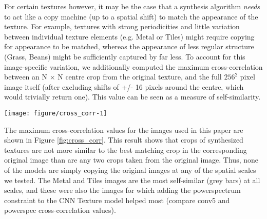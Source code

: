\documentclass[doc, 11pt,a4paper,natbib]{apa6}\usepackage[]{graphicx}\usepackage[]{color}
\makeatletter
\def\maxwidth{ %
  \ifdim\Gin@nat@width>\linewidth
    \linewidth
  \else
    \Gin@nat@width
  \fi
}
\newenvironment{knitrout}{}{} %
\makeatother
\begin{document}
For certain textures however, it may be the case that a synthesis algorithm \textit{needs} to act like a copy machine (up to a spatial shift) to match the appearance of the texture.
For example, textures with strong periodicities and little variation between individual texture elements (e.g. Metal or Tiles) might require copying for appearance to be matched, whereas the appearance of less regular structure (Grass, Beans) might be sufficiently captured by far less.
To account for this image-specific variation, we additionally computed the maximum cross-correlation between an N $\times$ N centre crop from the original texture, and the full $256^2$ pixel image itself (after excluding shifts of +/- 16 pixels around the centre, which would trivially return one).
This value can be seen as a measure of self-similarity.




\begin{knitrout}
\color{fgcolor}\begin{figure*}
\texttt{[image: figure/cross\_corr-1]} \caption[Controlling for texture model overfit]{Controlling for texture model overfit. 
              Points show the average maximum cross-correlations between crops of model syntheses (colours) and the original images, for three different crop sizes (32, 64 and 128 pixels; panels). 
              If the model simply copied and phase-shifted the original, these values would be approximately one.
              Bars show the baseline of a crop from the original image correlated to itself.
              Some images are more self-similar, and thus require some degree of copying to match appearance.}\label{fig:cross_corr}
\end{figure*}


\end{knitrout}


The maximum cross-correlation values for the images used in this paper are shown in Figure \ref{fig:cross_corr}. 
This result shows that crops of synthesized textures are not more similar to the best matching crop in the corresponding original image than are any two crops taken from the original image. 
Thus, none of the models are simply copying the original images at any of the spatial scales we tested. 
The Metal and Tiles images are the most self-similar (grey bars) at all scales, and these were also the images for which adding the powerspectrum constraint to the CNN Texture model helped most (compare conv5 and powerspec cross-correlation values).
\end{document}
